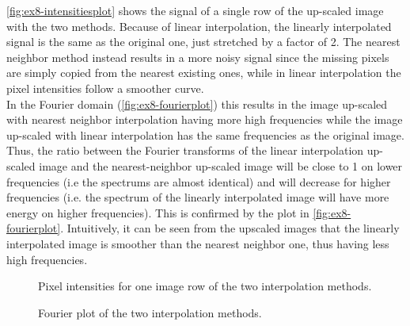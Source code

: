 \documentclass[tikz,14pt,fleqn]{article}
\begin{document}
\autoref{fig:ex8-intensitiesplot} shows the signal of a single row of the up-scaled image with the two methods. Because of linear interpolation, the linearly interpolated signal is the same as the original one, just stretched by a factor of 2. The nearest neighbor method instead results in a more noisy signal since the missing pixels are simply copied from the nearest existing ones, while in linear interpolation the pixel intensities follow a smoother curve.\\
In the Fourier domain (\autoref{fig:ex8-fourierplot}) this results in the image up-scaled with nearest neighbor interpolation having more high frequencies while the image up-scaled with linear interpolation has the same frequencies as the original image.
Thus, the ratio between the Fourier transforms of the linear interpolation up-scaled image and the nearest-neighbor up-scaled image will be close to 1 on lower frequencies (i.e the spectrums are almost identical) and will decrease for higher frequencies (i.e. the spectrum of the linearly interpolated image will have more energy on higher frequencies). This is confirmed by the plot in \autoref{fig:ex8-fourierplot}. Intuitively, it can be seen from the upscaled images that the linearly interpolated image is smoother than the nearest neighbor one, thus having less high frequencies.

\begin{figure}[h!]
    \centering
{}
\caption{Pixel intensities for one image row of the two interpolation methods.}
\label{fig:ex8-intensitiesplot}
\end{figure}

\begin{figure}[h!]
    \centering
{}
\caption{Fourier plot of the two interpolation methods.}
\label{fig:ex8-fourierplot}
\end{figure}
\end{document}
